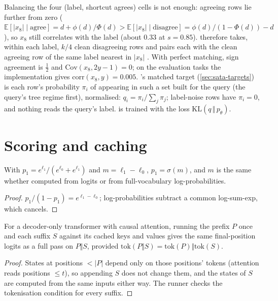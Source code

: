 Balancing the four (label, shortcut agrees) cells is not enough: agreeing rows lie further from zero ($\mathbb{E}[|x_8| \mid \text{agree}] = d + \phi(d)/\Phi(d) > \mathbb{E}[|x_8| \mid \text{disagree}] = \phi(d)/(1-\Phi(d)) - d$), so $x_8$ still correlates with the label (about 0.33 at $s = 0.85$).
 therefore takes, within each label, $k/4$ clean disagreeing rows and pairs each with the clean agreeing row of the same label nearest in $|x_8|$ \citep{rubin1973matching,stuart2010matching}.
With perfect matching, sign agreement is $\tfrac12$ and $\mathrm{Cov}(x_8, 2y-1) = 0$; on the evaluation tasks the implementation gives $\mathrm{corr}(x_8, y) = 0.005$.
\sata's matched target (\autoref{sec:sata-targets}) is each row's probability $\pi_i$ of appearing in such a set built for the query (the query's tree regime first), normalised: $q_i = \pi_i / \sum_j \pi_j$; label-noise rows have $\pi_i = 0$, and nothing reads the query's label.
\sata is trained with the loss $\mathrm{KL}(q \,\Vert\, p_\theta)$.

\section{Scoring and caching}

\begin{lemma}[Margin]
With $p_1 = e^{\ell_1}/(e^{\ell_0} + e^{\ell_1})$ and $m = \ell_1 - \ell_0$, $p_1 = \sigma(m)$, and $m$ is the same whether computed from logits or from full-vocabulary log-probabilities.
\end{lemma}
\begin{proof}
$p_1/(1 - p_1) = e^{\ell_1 - \ell_0}$; log-probabilities subtract a common log-sum-exp, which cancels.
\end{proof}

\begin{proposition}
For a decoder-only transformer with causal attention, running the prefix $P$ once and each suffix $S$ against its cached keys and values gives the same final-position logits as a full pass on $P \Vert S$, provided $\mathrm{tok}(P \Vert S) = \mathrm{tok}(P) \Vert \mathrm{tok}(S)$.
\end{proposition}
\begin{proof}
States at positions $< |P|$ depend only on those positions' tokens (attention reads positions $\le t$), so appending $S$ does not change them, and the states of $S$ are computed from the same inputs either way. The runner checks the tokenisation condition for every suffix.
\end{proof}

